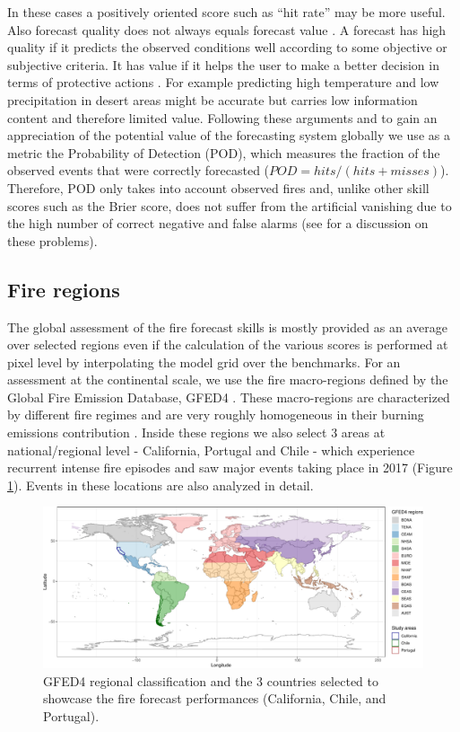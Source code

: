 \documentclass[, manuscript]{copernicus}
\begin{document}
In these cases a positively oriented score such as ``hit rate'' may be
more useful. Also forecast quality does not always equals forecast value
\citep{richardson:00}. A forecast has high quality if it predicts the
observed conditions well according to some objective or subjective
criteria. It has value if it helps the user to make a better decision in
terms of protective actions \citep{cloke:17}. For example predicting
high temperature and low precipitation in desert areas might be accurate
but carries low information content and therefore limited value.
Following these arguments and to gain an appreciation of the potential
value of the forecasting system globally we use as a metric the
Probability of Detection (POD), which measures the fraction of the
observed events that were correctly forecasted
(\(POD=hits/(hits+misses)\)). Therefore, POD only takes into account
observed fires and, unlike other skill scores such as the Brier score,
does not suffer from the artificial vanishing due to the high number of
correct negative and false alarms (see \citet{stephenson:08,ferro:11}
for a discussion on these problems).

\subsection{Fire regions}

The global assessment of the fire forecast skills is mostly provided as
an average over selected regions even if the calculation of the various
scores is performed at pixel level by interpolating the model grid over
the benchmarks. For an assessment at the continental scale, we use the
fire macro-regions defined by the Global Fire Emission Database, GFED4
\citep{giglio:13}. These macro-regions are characterized by different
fire regimes and are very roughly homogeneous in their burning emissions
contribution \citep{giglio:13}. Inside these regions we also select 3
areas at national/regional level - California, Portugal and Chile -
which experience recurrent intense fire episodes and saw major events
taking place in 2017 (Figure \ref{fig:Figure1}). Events in these
locations are also analyzed in detail.

\begin{figure}
\includegraphics[width=1\linewidth]{article_files/figure-latex/Figure1-1} \caption{\label{fig:Figure1}GFED4 regional classification and the 3 countries selected to showcase the fire forecast performances (California, Chile, and Portugal).}\label{fig:Figure1}
\end{figure}
\end{document}
